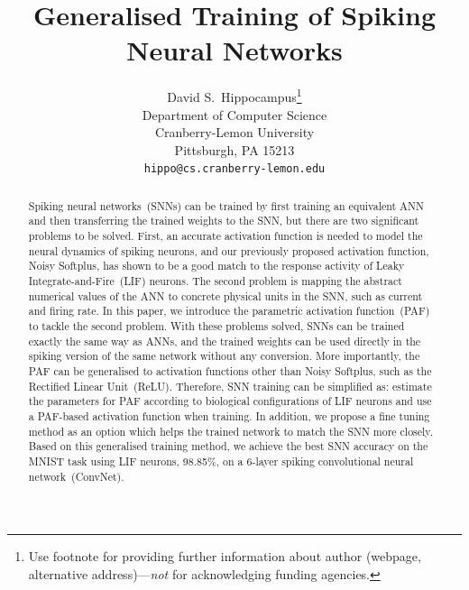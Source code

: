 \documentclass{article}
\title{Generalised Training of Spiking Neural Networks}
\author{
  David S.~Hippocampus\thanks{Use footnote for providing further
    information about author (webpage, alternative
    address)---\emph{not} for acknowledging funding agencies.} \\
  Department of Computer Science\\
  Cranberry-Lemon University\\
  Pittsburgh, PA 15213 \\
  \texttt{hippo@cs.cranberry-lemon.edu} \\
}
\begin{document}

\maketitle

\begin{abstract}
	Spiking neural networks~(SNNs) can be trained by first training an equivalent ANN and then transferring the trained weights to the SNN, but there are two significant problems to be solved.
	First, an accurate activation function is needed to model the neural dynamics of spiking neurons, and our previously proposed activation function, Noisy Softplus, has shown to be a good match to the response activity of Leaky Integrate-and-Fire~(LIF) neurons.
	The second problem is mapping the abstract numerical values of the ANN to concrete physical units in the SNN, such as current and firing rate.
	In this paper, we introduce the parametric activation function~(PAF) to tackle the second problem.
    With these problems solved, SNNs can be trained exactly the same way as ANNs, and the trained weights can be used directly in the spiking version of the same network without any conversion.
    More importantly, the PAF can be generalised to activation functions other than Noisy Softplus, such as the Rectified Linear Unit~(ReLU).%
    Therefore, SNN training can be simplified as: estimate the parameters for PAF according to biological configurations of LIF neurons and use a PAF-based
    activation function when training.
    In addition, we propose a fine tuning method as an option which helps the trained network to match the SNN more closely.
    Based on this generalised training method, we achieve the best SNN accuracy on the MNIST task using LIF neurons, 98.85\%, on a 6-layer spiking convolutional neural network~(ConvNet).
    


 
\end{abstract}
\end{document}
